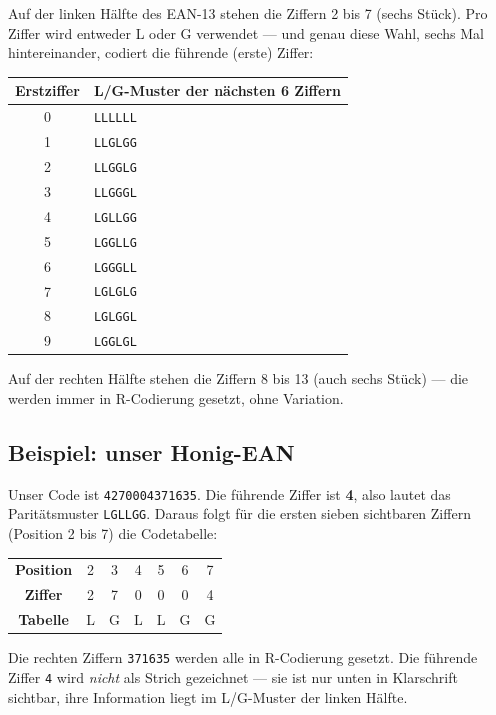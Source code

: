 Auf der linken Hälfte des EAN-13 stehen die Ziffern 2 bis 7 (sechs
Stück). Pro Ziffer wird entweder L oder G verwendet — und genau diese
Wahl, sechs Mal hintereinander, codiert die führende (erste)
Ziffer:

\begin{center}
\begin{tabular}{c l}
\toprule
\textbf{Erstziffer} & \textbf{L/G-Muster der nächsten 6 Ziffern} \\
\midrule
0 & \texttt{LLLLLL} \\
1 & \texttt{LLGLGG} \\
2 & \texttt{LLGGLG} \\
3 & \texttt{LLGGGL} \\
4 & \texttt{LGLLGG} \\
5 & \texttt{LGGLLG} \\
6 & \texttt{LGGGLL} \\
7 & \texttt{LGLGLG} \\
8 & \texttt{LGLGGL} \\
9 & \texttt{LGGLGL} \\
\bottomrule
\end{tabular}
\end{center}

Auf der rechten Hälfte stehen die Ziffern 8 bis 13 (auch sechs
Stück) — die werden immer in R-Codierung gesetzt, ohne Variation.

\subsection*{Beispiel: unser Honig-EAN}

Unser Code ist \texttt{4270004371635}. Die führende Ziffer ist
\textbf{4}, also lautet das Paritätsmuster \texttt{LGLLGG}. Daraus
folgt für die ersten sieben sichtbaren Ziffern (Position 2 bis 7) die
Codetabelle:

\begin{center}
\begin{tabular}{c c c c c c c}
\toprule
\textbf{Position} & 2 & 3 & 4 & 5 & 6 & 7 \\
\textbf{Ziffer}   & 2 & 7 & 0 & 0 & 0 & 4 \\
\textbf{Tabelle}  & L & G & L & L & G & G \\
\bottomrule
\end{tabular}
\end{center}

Die rechten Ziffern \texttt{371635} werden alle in R-Codierung
gesetzt. Die führende Ziffer \texttt{4} wird \emph{nicht} als Strich
gezeichnet — sie ist nur unten in Klarschrift sichtbar, ihre
Information liegt im L/G-Muster der linken Hälfte.

